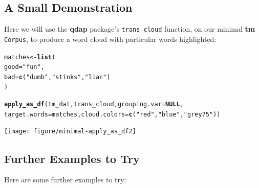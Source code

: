 \documentclass{article}\usepackage[]{graphicx}\usepackage[]{color}
\makeatletter
\newcommand{\hlstr}[1]{\textcolor[rgb]{0.192,0.494,0.8}{#1}}%
\newcommand{\hlstd}[1]{\textcolor[rgb]{0.345,0.345,0.345}{#1}}%
\newcommand{\hlkwa}[1]{\textcolor[rgb]{0.161,0.373,0.58}{\textbf{#1}}}%
\newcommand{\hlkwb}[1]{\textcolor[rgb]{0.69,0.353,0.396}{#1}}%
\newcommand{\hlkwc}[1]{\textcolor[rgb]{0.333,0.667,0.333}{#1}}%
\newcommand{\hlkwd}[1]{\textcolor[rgb]{0.737,0.353,0.396}{\textbf{#1}}}%
\newenvironment{kframe}{%
 \def\at@end@of@kframe{}%
 \ifinner\ifhmode%
  \def\at@end@of@kframe{\end{minipage}}%
  \begin{minipage}{\columnwidth}%
 \fi\fi%
 \def\FrameCommand##1{\hskip\@totalleftmargin \hskip-\fboxsep
 \colorbox{shadecolor}{##1}\hskip-\fboxsep
     \hskip-\linewidth \hskip-\@totalleftmargin \hskip\columnwidth}%
 \MakeFramed {\advance\hsize-\width
   \@totalleftmargin\z@ \linewidth\hsize
   \@setminipage}}%
 {\par\unskip\endMakeFramed%
 \at@end@of@kframe}
\newenvironment{knitrout}{}{} %
\makeatother
\begin{document}
\subsection{A Small Demonstration}

\hspace{.4cm} Here we will use the \textbf{qdap} package's \texttt{trans\_cloud} function, on our minimal \textbf{tm} \texttt{Corpus}, to produce a word cloud with particular words highlighted:

\begin{knitrout}
\color{fgcolor}\begin{kframe}
\begin{alltt}
\hlstd{matches} \hlkwb{<-} \hlkwd{list}\hlstd{(}
    \hlkwc{good} \hlstd{=} \hlstr{"fun"}\hlstd{,}
    \hlkwc{bad} \hlstd{=} \hlkwd{c}\hlstd{(}\hlstr{"dumb"}\hlstd{,} \hlstr{"stinks"}\hlstd{,} \hlstr{"liar"}\hlstd{)}
\hlstd{)}

\hlkwd{apply_as_df}\hlstd{(tm_dat, trans_cloud,} \hlkwc{grouping.var}\hlstd{=}\hlkwa{NULL}\hlstd{,}
    \hlkwc{target.words}\hlstd{=matches,} \hlkwc{cloud.colors} \hlstd{=} \hlkwd{c}\hlstd{(}\hlstr{"red"}\hlstd{,} \hlstr{"blue"}\hlstd{,} \hlstr{"grey75"}\hlstd{))}
\end{alltt}
\end{kframe}
\end{knitrout}


\begin{knitrout}
\color{fgcolor}

{\centering \texttt{[image: figure/minimal-apply\_as\_df2]} 

}



\end{knitrout}


\subsection{Further Examples to Try}

\hspace{.4cm} Here are some further examples to try:
\end{document}
